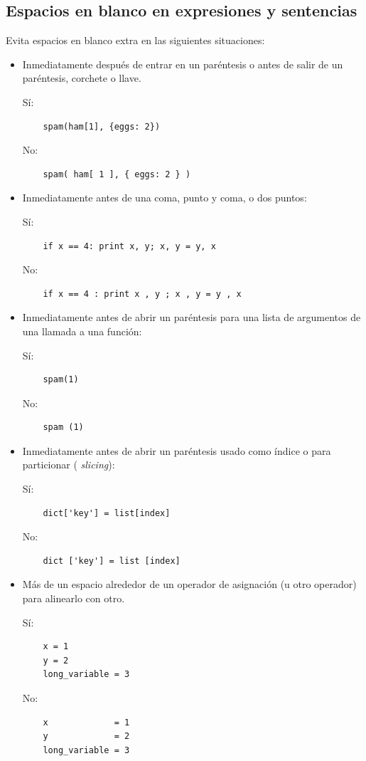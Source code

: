 \documentclass[a4paper,11pt,oneside]{book}
\begin{document}
\subsection{Espacios en blanco en expresiones y sentencias}
Evita espacios en blanco extra en las siguientes situaciones:
\begin{itemize}
\item Inmediatamente después de entrar en un paréntesis o antes de salir de un paréntesis, corchete o llave.

Sí:
\begin{lstlisting}
    spam(ham[1], {eggs: 2})
\end{lstlisting}
No:
\begin{lstlisting}
    spam( ham[ 1 ], { eggs: 2 } )
\end{lstlisting}
\item Inmediatamente antes de una coma, punto y coma, o dos puntos:

Sí:
\begin{lstlisting}
    if x == 4: print x, y; x, y = y, x
\end{lstlisting}
No:
\begin{lstlisting}
    if x == 4 : print x , y ; x , y = y , x
\end{lstlisting}
\item Inmediatamente antes de abrir un paréntesis para una lista de argumentos de una llamada a una función:

Sí:
\begin{lstlisting}
    spam(1)
\end{lstlisting}
No:
\begin{lstlisting}
    spam (1)
\end{lstlisting}
\item Inmediatamente antes de abrir un paréntesis usado como índice o para particionar ( \emph{slicing}):

Sí:
\begin{lstlisting}
    dict['key'] = list[index]
\end{lstlisting}
No:
\begin{lstlisting}
    dict ['key'] = list [index]
\end{lstlisting}
\item Más de un espacio alrededor de un operador de asignación (u otro operador) para alinearlo con otro.

Sí:
\begin{lstlisting}
    x = 1
    y = 2
    long_variable = 3
\end{lstlisting}
No:
\begin{lstlisting}
    x             = 1
    y             = 2
    long_variable = 3
\end{lstlisting}
\end{itemize}
\end{document}
